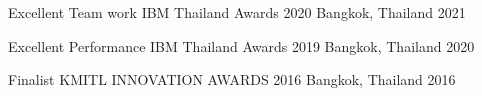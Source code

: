 


\begin{cvhonors}


  \cvhonor
  {Excellent Team work} %
  {IBM Thailand Awards 2020} %
  {Bangkok, Thailand} %
  {2021} %


  \cvhonor
    {Excellent Performance} %
    {IBM Thailand Awards 2019} %
    {Bangkok, Thailand} %
    {2020} %


  \cvhonor
    {Finalist} %
    {KMITL INNOVATION AWARDS 2016} %
    {Bangkok, Thailand} %
    {2016} %

\end{cvhonors}
